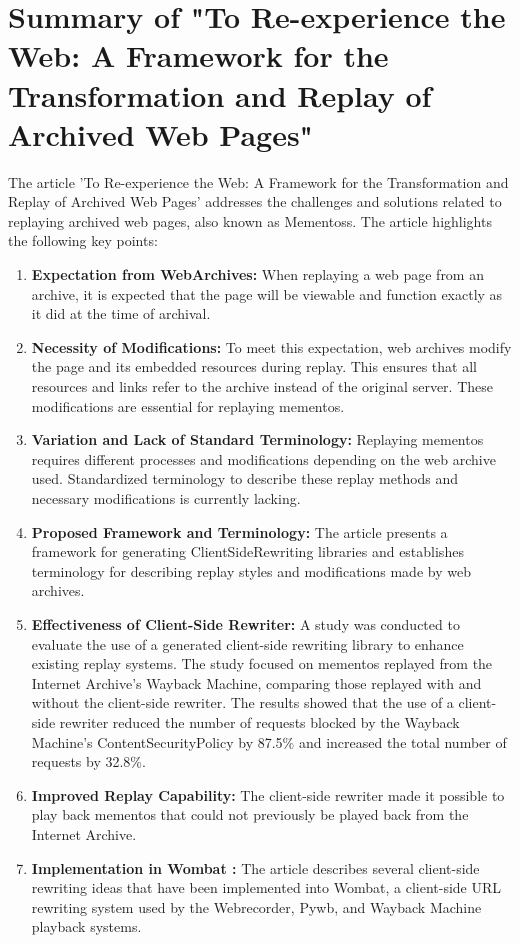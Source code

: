 \section{Summary of "To Re-experience the Web: A Framework for the Transformation and Replay of Archived Web Pages"}\label{app:summary_article}
The article 'To Re-experience the Web: A Framework for the Transformation and \gls{Replay} of Archived Web Pages' addresses the challenges and solutions related to replaying archived web pages, also known as \glspl{Mementos}. The article highlights the following key points:
\begin{enumerate}
	\item \textbf{Expectation from \glspl{WebArchive}:} When replaying a web page from an archive, it is expected that the page will be viewable and function exactly as it did at the time of archival.
	\item \textbf{Necessity of Modifications:} To meet this expectation, web archives modify the page and its embedded resources during replay. This ensures that all resources and links refer to the archive instead of the original server. These modifications are essential for replaying mementos.
	\item \textbf{Variation and Lack of Standard Terminology:} Replaying mementos requires different processes and modifications depending on the web archive used. Standardized terminology to describe these replay methods and necessary modifications is currently lacking.
	\item \textbf{Proposed Framework and Terminology:} The article presents a framework for generating \gls{ClientSideRewriting} libraries and establishes terminology for describing replay styles and modifications made by web archives.
	\item \textbf{Effectiveness of Client-Side Rewriter:} A study was conducted to evaluate the use of a generated client-side rewriting library to enhance existing replay systems. The study focused on mementos replayed from the Internet Archive's Wayback Machine, comparing those replayed with and without the client-side rewriter. The results showed that the use of a client-side rewriter reduced the number of requests blocked by the Wayback Machine's \gls{ContentSecurityPolicy} by 87.5\% and increased the total number of requests by 32.8\%.
	\item \textbf{Improved Replay Capability:} The client-side rewriter made it possible to play back mementos that could not previously be played back from the Internet Archive.
	\item \textbf{Implementation in \gls{Wombat} :} The article describes several client-side rewriting ideas that have been implemented into Wombat, a client-side URL rewriting system used by the \gls{Webrecorder}, \gls{Pywb}, and Wayback Machine playback systems.
\end{enumerate}